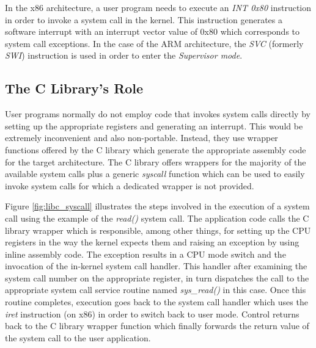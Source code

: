 In the x86 architecture, a user program needs to execute an \emph{INT 0x80}
instruction in order to invoke a system call in the kernel\footnotemark. This
instruction generates a software interrupt with an interrupt vector value of
0x80 which corresponds to system call exceptions. In the case of the ARM
architecture, the \emph{SVC} (formerly \emph{SWI}) instruction is used in order
to enter the \emph{Supervisor mode}.


\subsection{The C Library's Role}

User programs normally do not employ code that invokes system calls directly by
setting up the appropriate registers and generating an interrupt. This would be
extremely inconvenient and also non-portable. Instead, they use wrapper
functions offered by the C library which generate the appropriate assembly code
for the target architecture. The C library offers wrappers for the majority of
the available system calls plus a generic \emph{syscall} function which can be
used to easily invoke system calls for which a dedicated wrapper is not
provided.

Figure \ref{fig:libc_syscall} illustrates the steps involved in the execution
of a system call using the example of the \emph{read()} system call. The
application code calls the C library wrapper which is responsible, among other
things, for setting up the CPU registers in the way the kernel expects them and
raising an exception by using inline assembly code. The exception results in a
CPU mode switch and the invocation of the in-kernel system call handler. This
handler after examining the system call number on the appropriate register, in
turn dispatches the call to the appropriate system call service routine named
\emph{sys\_read()} in this case. Once this routine completes, execution goes
back to the system call handler which uses the \emph{iret} instruction (on x86)
in order to switch back to user mode. Control returns back to the C library
wrapper function which finally forwards the return value of the system call to
the user application.

